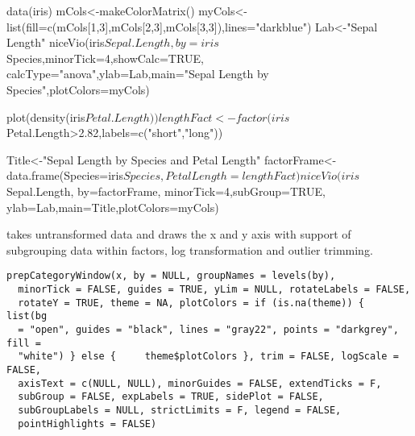 \documentclass[a4paper]{book}
\begin{document}
\begin{Examples}
\begin{ExampleCode}
data(iris)
mCols<-makeColorMatrix()
myCols<-list(fill=c(mCols[1,3],mCols[2,3],mCols[3,3]),lines="darkblue")
Lab<-"Sepal Length"
niceVio(iris$Sepal.Length,by=iris$Species,minorTick=4,showCalc=TRUE,
    calcType="anova",ylab=Lab,main="Sepal Length by Species",plotColors=myCols)


plot(density(iris$Petal.Length))
lengthFact<-factor(iris$Petal.Length>2.82,labels=c("short","long"))


Title<-"Sepal Length by Species and Petal Length"
factorFrame<-data.frame(Species=iris$Species,PetalLength=lengthFact)
niceVio(iris$Sepal.Length, by=factorFrame, minorTick=4,subGroup=TRUE,
    ylab=Lab,main=Title,plotColors=myCols)
\end{ExampleCode}
\end{Examples}
%
\begin{Description}\relax
takes untransformed data and draws the x and y axis with support of subgrouping data within factors, log transformation and outlier trimming.
\end{Description}
%
\begin{Usage}
\begin{verbatim}
prepCategoryWindow(x, by = NULL, groupNames = levels(by),
  minorTick = FALSE, guides = TRUE, yLim = NULL, rotateLabels = FALSE,
  rotateY = TRUE, theme = NA, plotColors = if (is.na(theme)) {     list(bg
  = "open", guides = "black", lines = "gray22", points = "darkgrey", fill =
  "white") } else {     theme$plotColors }, trim = FALSE, logScale = FALSE,
  axisText = c(NULL, NULL), minorGuides = FALSE, extendTicks = F,
  subGroup = FALSE, expLabels = TRUE, sidePlot = FALSE,
  subGroupLabels = NULL, strictLimits = F, legend = FALSE,
  pointHighlights = FALSE)
\end{verbatim}
\end{Usage}
%
\end{document}
